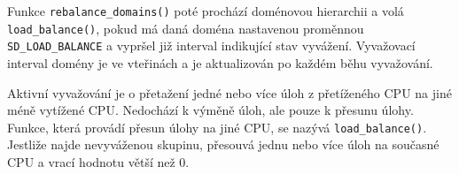 \documentclass[
  master=true,
  font=sans,
  printversion=false,
  joinlists=true,
  figures=true,
  tables=true,
  sourcecodes=false,
  theorems=false,
  bibencoding=utf8,
  language=czech,
  encoding=utf8,
  field=ainfk,
  biblatex,
  glossaries,
  index
]{kidiplom}
\begin{document}
Funkce \verb#rebalance_domains()# poté prochází doménovou hierarchii a volá \verb#load_balance()#, pokud má daná doména nastavenou proměnnou \linebreak \verb#SD_LOAD_BALANCE# a vypršel již interval indikující stav vyvážení. Vyvažovací interval domény je ve vteřinách a je aktualizován po každém běhu vyvažování.

Aktivní vyvažování je o přetažení jedné nebo více úloh z přetíženého CPU na jiné méně vytížené CPU. Nedochází k výměně úloh, ale pouze k přesunu úlohy. Funkce, která provádí přesun úlohy na jiné CPU, se nazývá \verb#load_balance()#. Jestliže najde nevyváženou skupinu, přesouvá jednu nebo více úloh na současné CPU a vrací hodnotu větší než 0.

%
%
%
%
%
%
%
%
%
%
%
%
%
%
%
%
%
\end{document}
